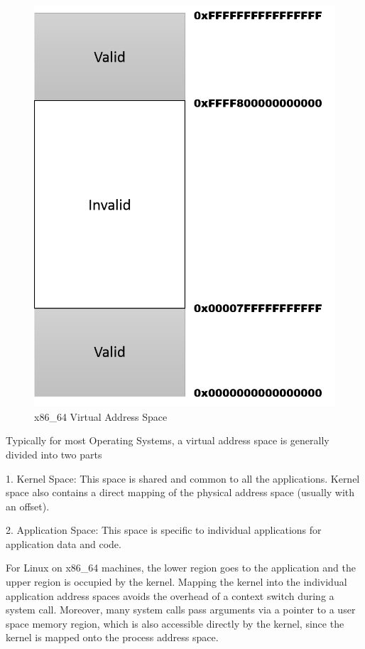\begin{figure}[H]
\centering
\includegraphics[scale=0.6]{figures/x86_64_VA_space.png}
\caption{x86\_64 Virtual Address Space}
\label{fig:x86_memspace}
\end{figure}

Typically for most Operating Systems, a virtual address space is generally divided into two parts

1. Kernel Space: This space is shared and common to all the applications. Kernel space also contains a direct mapping of the physical address space (usually with an offset).

2. Application Space: This space is specific to individual applications for application data and code.

For Linux on x86\_64 machines, the lower region goes to the application and the upper region is occupied by the kernel. Mapping the kernel into the individual application address spaces avoids the overhead of a context switch during a system call. Moreover, many system calls pass arguments via a pointer to a user space memory region, which is also accessible directly by the kernel, since the kernel is mapped onto the process address space. 

